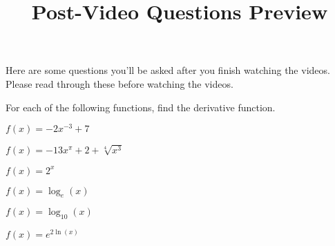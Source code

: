\documentclass[handout]{ximera}
\title{Post-Video Questions Preview}
\begin{document}
\begin{abstract}
\end{abstract}


\maketitle

Here are some questions you’ll be asked after you finish watching the videos. Please read through these before watching the videos.


For each of the following functions, find the derivative function.

\begin{problem}
$f(x)=-2x^{-3}+7$
\end{problem}

\begin{problem}
$f(x)=-13 x^{\pi}+2+\sqrt[4]{x^3}$
\end{problem}

\begin{problem}
$f(x)= 2^x$
\end{problem}

\begin{problem}
$f(x)=\log_e(x)$
\end{problem}

\begin{problem}
$f(x)=\log_{10}(x)$
\end{problem}

\begin{problem}
$f(x)=e^{2\ln(x)}$
\end{problem}
\end{document}
